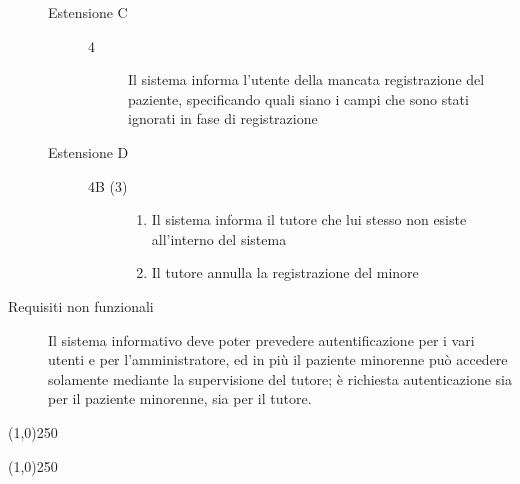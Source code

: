 \begin{description}
\begin{description}
	\item[Estensione C]
	\medskip
	
	\begin{description}
	\item[4] 
	\medskip
	
	Il sistema informa l'utente della mancata registrazione del paziente, specificando quali siano i campi che sono stati ignorati in fase di registrazione
	\end{description}
\end{description}

\begin{description}
	\item[Estensione D]
	\medskip
	
	\begin{description}
	\item[4B (3)] 
	\medskip
	
	\begin{enumerate}
	\item Il sistema informa il tutore che lui stesso non esiste all'interno del sistema
	\item Il tutore annulla la registrazione del minore 
	\end{enumerate}
	\end{description}

\end{description}
\item[Requisiti non funzionali]
\begin{itemize}
\diam Il sistema informativo deve poter prevedere autentificazione per i vari
	utenti e per l'amministratore, ed in più il paziente minorenne può accedere solamente mediante
	la supervisione del tutore; è richiesta autenticazione  sia per il
	paziente minorenne, sia per il tutore.
\end{itemize}
\end{description}
\begin{center}
\line(1,0){250}
\end{center}

\pagebreak

\begin{center}
\line(1,0){250}
\end{center}



